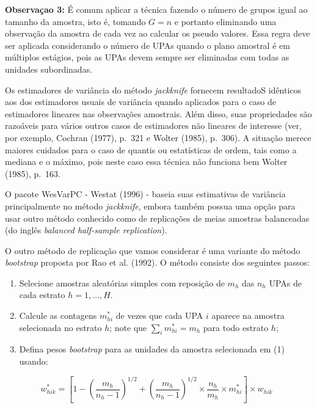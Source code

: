 \documentclass[
  12pt,
  brazilian,
]{book}
\theoremstyle{definition}
\theoremstyle{definition}
\theoremstyle{definition}
\theoremstyle{definition}
\theoremstyle{remark}
\begin{document}
\textbf{Observaçao 3:} É comum aplicar a técnica fazendo o número de grupos igual ao tamanho da amostra, isto é, tomando \(G=n\) e portanto eliminando uma observação da amostra de cada vez ao calcular os pseudo valores. Essa regra deve ser aplicada considerando o número de UPAs quando o plano amostral é em múltiplos estágios, pois as UPAs devem sempre ser eliminadas com todas as unidades subordinadas.

Os estimadores de variância do método \emph{jackknife} fornecem resultadoS idênticos aos dos estimadores usuais de variância quando aplicados para o caso de estimadores lineares nas observações amostrais. Além disso, suas propriedades são razoáveis para vários outros casos de estimadores não lineares de interesse (ver, por exemplo, Cochran (1977), p.~321 e Wolter (1985), p.~306). A situação merece maiores cuidados para o caso de quantis ou estatísticas de ordem, tais como a mediana e o máximo, pois neste caso essa técnica não funciona bem Wolter (1985), p.~163.

O pacote WesVarPC - Westat (1996) - baseia suas estimativas de variância principalmente no método \emph{jackknife}, embora também possua uma opção para usar outro método conhecido como de replicações de meias amostras balanceadas (do inglês \emph{balanced half-sample replication}).

O outro método de replicação que vamos considerar é uma variante do método \emph{bootstrap} proposta por Rao et al. (1992). O método consiste dos seguintes passos:

\begin{enumerate}
\def\labelenumi{\arabic{enumi})}
\item
  Selecione amostras aleatórias simples com reposição de \(m_h\) das \(n_h\) UPAs de cada estrato \(h=1, \dots, H\).
\item
  Calcule as contagens \(m_{hi}^*\) de vezes que cada UPA \(i\) aparece na amostra selecionada no estrato \(h\); note que \(\sum_i m_{hi}^* = m_h\) para todo estrato \(h\);
\item
  Defina pesos \emph{bootstrap} para as unidades da amostra selecionada em (1) usando:
\end{enumerate}

\begin{equation}
 w_{hik}^* = \left[ 1 - \left( \frac{m_h} {n_h - 1} \right)^{1/2} +  \left( \frac{m_h} {n_h - 1} \right)^{1/2} \times \frac{n_h} {m_h} \times m_{hi}^* \right] \times w_{hik}  \,\,\, \label{eq:estpa29}
\end{equation}
\end{document}
